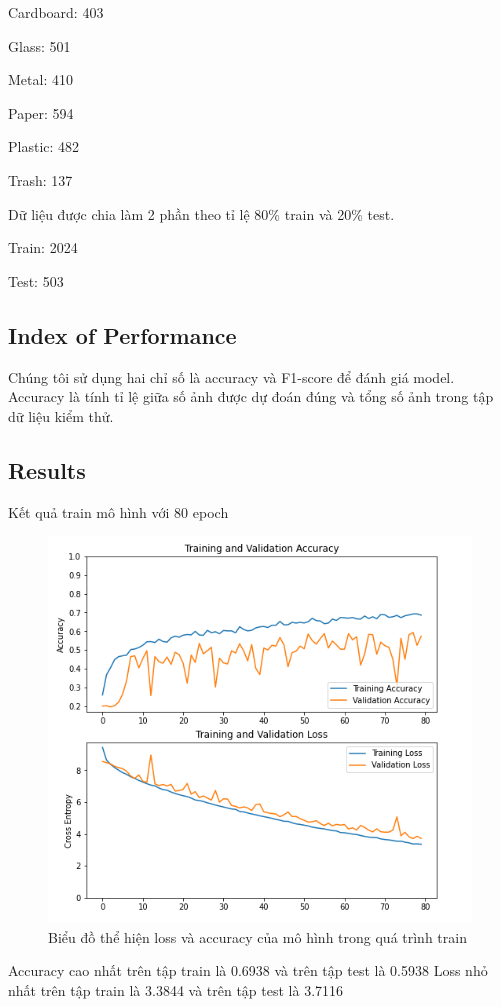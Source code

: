 Cardboard: 403

Glass: 501

Metal: 410

Paper: 594

Plastic: 482

Trash: 137
 
Dữ liệu được chia làm 2 phần theo tỉ lệ 80\% train và 20\% test.

Train: 2024

Test: 503
\subsection{Index of Performance} %
Chúng tôi sử dụng hai chỉ số là accuracy và F1-score để đánh giá model. Accuracy là tính tỉ lệ giữa số ảnh được dự đoán đúng và tổng số ảnh trong tập dữ liệu kiểm thử.
\subsection{Results} %
Kết quả train mô hình với 80 epoch
\begin{figure}[ht]
    \centering
    \includegraphics[width=\linewidth]{images/graph.png}
    \caption{ Biểu đồ thể hiện loss và accuracy của mô hình trong quá trình train}
    \label{fig:graph}
\end{figure}
Accuracy cao nhất trên tập train là 0.6938 và trên tập test là 0.5938
Loss nhỏ nhất trên tập train là 3.3844 và trên tập test là 3.7116

